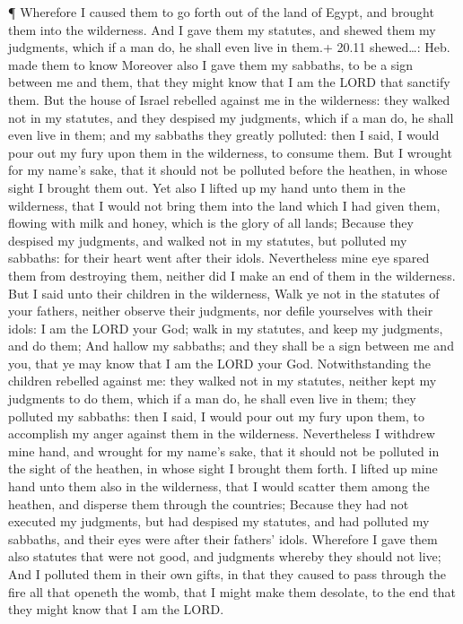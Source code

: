  ¶ Wherefore I caused them to go forth out of the land of
Egypt, and brought them into the wilderness.  And I gave
them my statutes, and shewed them my judgments, which if a man do, he
shall even live in them.+ 20.11 shewed\ldots: Heb. made them to know
 Moreover also I gave them my sabbaths, to be a sign
between me and them, that they might know that I am the LORD that
sanctify them.  But the house of Israel rebelled against me
in the wilderness: they walked not in my statutes, and they despised my
judgments, which if a man do, he shall even live in them; and my
sabbaths they greatly polluted: then I said, I would pour out my fury
upon them in the wilderness, to consume them.  But I
wrought for my name's sake, that it should not be polluted before the
heathen, in whose sight I brought them out.  Yet also I
lifted up my hand unto them in the wilderness, that I would not bring
them into the land which I had given them, flowing with milk and honey,
which is the glory of all lands;  Because they despised my
judgments, and walked not in my statutes, but polluted my sabbaths: for
their heart went after their idols.  Nevertheless mine eye
spared them from destroying them, neither did I make an end of them in
the wilderness.  But I said unto their children in the
wilderness, Walk ye not in the statutes of your fathers, neither observe
their judgments, nor defile yourselves with their idols:  I
am the LORD your God; walk in my statutes, and keep my judgments, and do
them;  And hallow my sabbaths; and they shall be a sign
between me and you, that ye may know that I am the LORD your God.
 Notwithstanding the children rebelled against me: they
walked not in my statutes, neither kept my judgments to do them, which
if a man do, he shall even live in them; they polluted my sabbaths: then
I said, I would pour out my fury upon them, to accomplish my anger
against them in the wilderness.  Nevertheless I withdrew
mine hand, and wrought for my name's sake, that it should not be
polluted in the sight of the heathen, in whose sight I brought them
forth.  I lifted up mine hand unto them also in the
wilderness, that I would scatter them among the heathen, and disperse
them through the countries;  Because they had not executed
my judgments, but had despised my statutes, and had polluted my
sabbaths, and their eyes were after their fathers' idols. 
Wherefore I gave them also statutes that were not good, and judgments
whereby they should not live;  And I polluted them in their
own gifts, in that they caused to pass through the fire all that openeth
the womb, that I might make them desolate, to the end that they might
know that I am the LORD.

